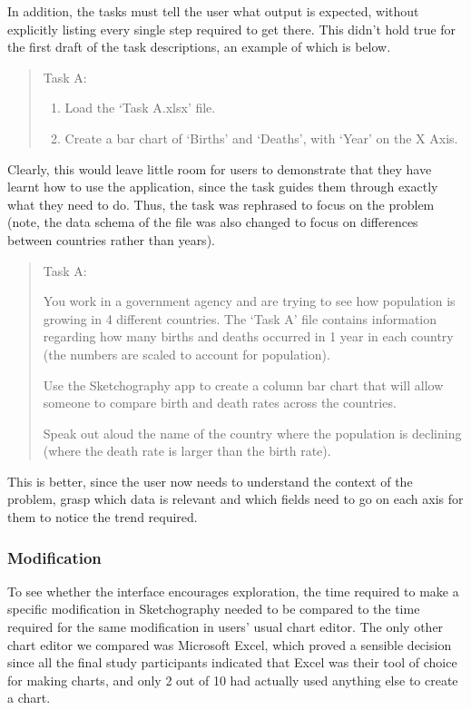 In addition, the tasks must tell the user what output is expected, without explicitly listing every single step required to get there. This didn't hold true for the first draft of the task descriptions, an example of which is below.

\begin{quotation}
Task A:
\begin{enumerate}
\item Load the `Task A.xlsx' file.
\item Create a bar chart of `Births' and `Deaths', with `Year' on the X Axis.
\end{enumerate}
\end{quotation}

Clearly, this would leave little room for users to demonstrate that they have learnt how to use the application, since the task guides them through exactly what they need to do. Thus, the task was rephrased to focus on the problem (note, the data schema of the file was also changed to focus on differences between countries rather than years).

\begin{quotation}
Task A:

You work in a government agency and are trying to see how population is growing in 4 different countries. The ‘Task A’ file contains information regarding how many births and deaths occurred in 1 year in each country (the numbers are scaled to account for population). 

Use the Sketchography app to create a column bar chart that will allow someone to compare birth and death rates across the countries.

Speak out aloud the name of the country where the population is declining (where the death rate is larger than the birth rate).

\end{quotation}

This is better, since the user now needs to understand the context of the problem, grasp which data is relevant and which fields need to go on each axis for them to notice the trend required.

\subsubsection*{Modification}
To see whether the interface encourages exploration, the time required to make a specific modification in Sketchography needed to be compared to the time required for the same modification in users' usual chart editor. The only other chart editor we compared was Microsoft Excel, which proved a sensible decision since all the final study participants indicated that Excel was their tool of choice for making charts, and only 2 out of 10 had actually used anything else to create a chart.


